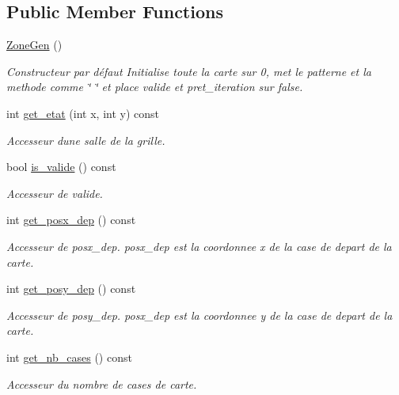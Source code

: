 \subsection*{Public Member Functions}
\begin{DoxyCompactItemize}
\item 
\hyperlink{classZoneGen_aae2af3fc6b6db23a7b1f7091115ef392}{Zone\+Gen} ()
\begin{DoxyCompactList}\small\item\em Constructeur par défaut Initialise toute la carte sur 0, met le {\itshape patterne} et la {\itshape methode} comme \char`\"{} \char`\"{} et place {\itshape valide} et {\itshape pret\+\_\+iteration} sur false. \end{DoxyCompactList}\item 
int \hyperlink{classZoneGen_a893e3c5d0ae5ecc50bf19a5d90e89b45}{get\+\_\+etat} (int x, int y) const 
\begin{DoxyCompactList}\small\item\em Accesseur d\textquotesingle{}une \textquotesingle{}salle\textquotesingle{} de la grille. \end{DoxyCompactList}\item 
bool \hyperlink{classZoneGen_a0e073b705a18999388b0b85b7c11a080}{is\+\_\+valide} () const 
\begin{DoxyCompactList}\small\item\em Accesseur de {\itshape valide}. \end{DoxyCompactList}\item 
int \hyperlink{classZoneGen_ac64697de6f96b242b2fb191af66e1a30}{get\+\_\+posx\+\_\+dep} () const 
\begin{DoxyCompactList}\small\item\em Accesseur de {\itshape posx\+\_\+dep}. posx\+\_\+dep est la coordonnee x de la case de depart de la {\itshape carte}. \end{DoxyCompactList}\item 
int \hyperlink{classZoneGen_aa8a3a729f5d2106dbb47f33aa4d8bc9a}{get\+\_\+posy\+\_\+dep} () const 
\begin{DoxyCompactList}\small\item\em Accesseur de {\itshape posy\+\_\+dep}. posx\+\_\+dep est la coordonnee y de la case de depart de la {\itshape carte}. \end{DoxyCompactList}\item 
int \hyperlink{classZoneGen_a76588fc3a5d361a213ec28692b8abcdc}{get\+\_\+nb\+\_\+cases} () const 
\begin{DoxyCompactList}\small\item\em \textquotesingle{}Accesseur\textquotesingle{} du nombre de cases de {\itshape carte}. \end{DoxyCompactList}\item 

\end{DoxyCompactItemize}

